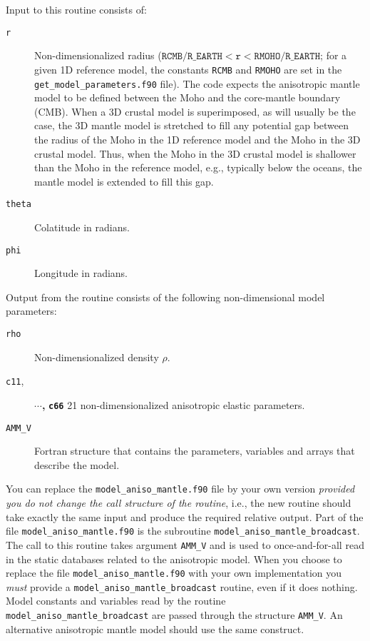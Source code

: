 \noindent
Input to this routine consists of:
\begin{description}
\item [{\texttt{r}}] Non-dimensionalized radius ($\texttt{RCMB/R\_ EARTH}<\texttt{r}<\texttt{RMOHO/R\_ EARTH}$;
for a given 1D reference model, the constants \texttt{RCMB} and \texttt{RMOHO}
are set in the \texttt{\small get\_model\_parameters}\texttt{.f90}
file). The code expects the anisotropic mantle model to be defined
between the Moho and the core-mantle boundary (CMB). When a 3D crustal
model is superimposed, as will usually be the case, the 3D mantle
model is stretched to fill any potential gap between the radius of
the Moho in the 1D reference model and the Moho in the 3D crustal
model. Thus, when the Moho in the 3D crustal model is shallower than
the Moho in the reference model, e.g., typically below the oceans,
the mantle model is extended to fill this gap.
\item [{\texttt{theta}}] Colatitude in radians.
\item [{\texttt{phi}}] Longitude in radians.
\end{description}
%
Output from the routine consists of the following non-dimensional
model parameters:
\begin{description}
\item [{\texttt{rho}}] Non-dimensionalized density $\rho$.
\item [{\texttt{c11},}] \textbf{$\cdots$,} \texttt{\textbf{c66}} 21 non-dimensionalized
anisotropic elastic parameters.
\item [{\texttt{AMM\_V}}] Fortran structure that contains the parameters,
variables and arrays that describe the model.
\end{description}
You can replace the \texttt{model\_aniso\_mantle.f90} file by
your own version \textit{provided you do not change the call structure
of the routine}, i.e., the new routine should take exactly the same
input and produce the required relative output. Part of the file \texttt{model\_aniso\_mantle.f90}
is the subroutine \texttt{model\_aniso\_mantle\_broadcast}. The call to
this routine takes argument \texttt{AMM\_V} and is used to once-and-for-all
read in the static databases related to the anisotropic model. When
you choose to replace the file \texttt{model\_aniso\_mantle.f90}
with your own implementation you \textit{must} provide a \texttt{model\_aniso\_mantle\_broadcast}
routine, even if it does nothing. Model constants and variables read
by the routine \texttt{model\_aniso\_mantle\_broadcast} are passed through the
structure \texttt{AMM\_V}. An alternative anisotropic mantle model
should use the same construct.

